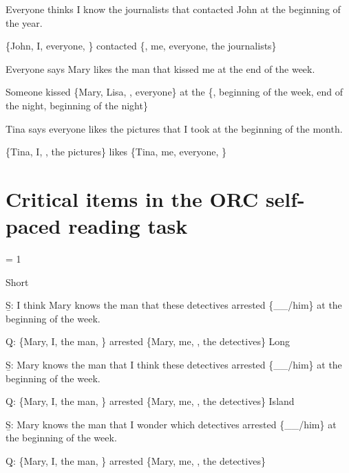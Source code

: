 \pex %
\a[label=S] Everyone thinks I know the journalists that contacted John at the beginning of the year.\par\nobreak
\a[label=Q] \{John, I, everyone, \} contacted \{, me, everyone, the journalists\}
\xe

\pex %
\a[label=S] Everyone says Mary likes the man that kissed me at the end of the week.\par\nobreak
\a[label=Q] Someone kissed \{Mary, Lisa, , everyone\} at the \{, beginning of the week, end of the night, beginning of the night\}
\xe

\pex %
\a[label=S] Tina says everyone likes the pictures that I took at the beginning of the month.\par\nobreak
\a[label=Q] \{Tina, I, , the pictures\} likes \{Tina, me, everyone, \}
\xe

\section{Critical items in the ORC self-paced reading task}

\excnt = 1

\pex 
\a Short\par\nobreak
\beginsubsub
\b{S:} I think Mary knows the man that these detectives arrested \{\_\_/him\} at the beginning of the week.\par\nobreak
\b{Q:} \{Mary, I, the man, \} arrested \{Mary, me, , the detectives\}
\endsubsub
\a Long\par\nobreak
\beginsubsub
\b{S:} Mary knows the man that I think these detectives arrested \{\_\_/him\} at the beginning of the week.\par\nobreak
\b{Q:} \{Mary, I, the man, \} arrested \{Mary, me, , the detectives\}
\endsubsub
\a Island\par\nobreak
\beginsubsub
\b{S:} Mary knows the man that I wonder which detectives arrested \{\_\_/him\} at the beginning of the week.\par\nobreak
\b{Q:} \{Mary, I, the man, \} arrested \{Mary, me, , the detectives\}
\endsubsub
\xe


